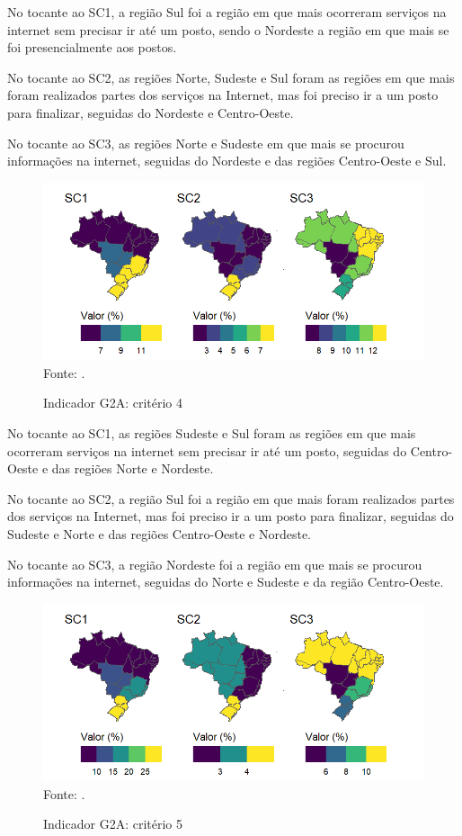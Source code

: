No tocante ao SC1, a região Sul foi a região em que mais ocorreram serviços na internet sem precisar ir até um posto, sendo o Nordeste a região em que mais se foi presencialmente aos postos.

No tocante ao SC2, as regiões Norte, Sudeste e Sul foram as regiões em que mais foram realizados partes dos serviços na Internet, mas foi preciso ir a um posto para finalizar, seguidas do Nordeste e Centro-Oeste.

No tocante ao SC3, as regiões Norte e Sudeste em que mais se procurou informações na internet, seguidas do Nordeste e das regiões Centro-Oeste e Sul.

\begin{figure}[H]
	\centering
	\caption{Indicador G2A: critério 4}
	\includegraphics[width=1\linewidth]{figuras/mapa_coropletico_tic_domicilios_2024_g2a_4.png}
	\label{fig:mapa_coropletico_tic_domicilios_2024_g2a_4}
	\footnotesize{Fonte: \cite{tic_domicilios_2024_g2a}.}
\end{figure}

No tocante ao SC1, as regiões Sudeste e Sul foram as regiões em que mais ocorreram serviços na internet sem precisar ir até um posto, seguidas do Centro-Oeste e das regiões Norte e Nordeste.

No tocante ao SC2, a região Sul foi a região em que mais foram realizados partes dos serviços na Internet, mas foi preciso ir a um posto para finalizar, seguidas do Sudeste e Norte e das regiões Centro-Oeste e Nordeste.

No tocante ao SC3, a região Nordeste foi a região em que mais se procurou informações na internet, seguidas do Norte e Sudeste e da região Centro-Oeste.

\begin{figure}[H]
	\centering
	\caption{Indicador G2A: critério 5}
	\includegraphics[width=1\linewidth]{figuras/mapa_coropletico_tic_domicilios_2024_g2a_5.png}
	\label{fig:mapa_coropletico_tic_domicilios_2024_g2a_5}
	\footnotesize{Fonte: \cite{tic_domicilios_2024_g2a}.}
\end{figure}


